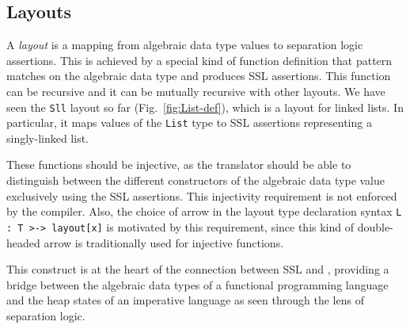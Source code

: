 \subsection{Layouts}
\label{sec:layouts}

A \textit{layout} is a mapping from algebraic data type values to separation logic assertions. This is achieved by a special kind of function definition that pattern matches on the algebraic data type and produces SSL assertions. This function can be recursive and it can be mutually recursive with other layouts. We have seen the \verb|Sll| layout so far (Fig.~\ref{fig:List-def}), which is a layout for linked lists. In particular, it maps values of the \verb|List| type to SSL assertions representing a singly-linked list.

These functions should be injective, as the translator should be able to distinguish between the different constructors of the algebraic data type value exclusively using the SSL assertions. This injectivity requirement is not enforced by the compiler. Also, the choice of arrow in the layout type declaration syntax \lstinline[language=Pika]{L : T >-> layout[x]} is motivated by this requirement, since this kind of double-headed arrow is traditionally used for injective functions.

This construct is at the heart of the connection between SSL and \Pika, providing a bridge between the algebraic data types of a functional programming language and the heap states of an imperative language as seen through the lens of separation logic.

